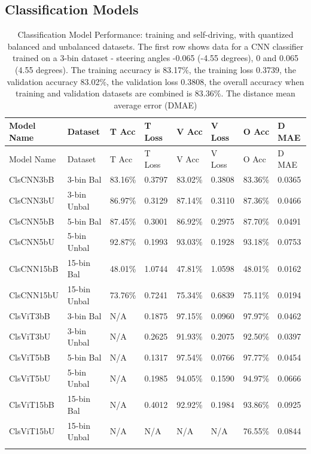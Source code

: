 \subsection{Classification Models}
\begin{longtable}{@{}llllllll@{}}
\toprule
Model Name & Dataset & T Acc & T Loss & V Acc & V Loss & O Acc & D MAE \\
\midrule
\endfirsthead
\toprule
Model Name & Dataset & T Acc & T Loss & V Acc & V Loss & O Acc & D MAE \\
\midrule
\endhead
ClsCNN3bB & 3-bin Bal & 83.16\% & 0.3797 & 83.02\% & 0.3808 & 83.36\% & 0.0365 \\
ClsCNN3bU & 3-bin Unbal & 86.97\% & 0.3129 & 87.14\% & 0.3110 & 87.36\% & 0.0466 \\
ClsCNN5bB & 5-bin Bal & 87.45\% & 0.3001 & 86.92\% & 0.2975 & 87.70\% & 0.0491 \\
ClsCNN5bU & 5-bin Unbal & 92.87\% & 0.1993 & 93.03\% & 0.1928 & 93.18\% & 0.0753 \\
ClsCNN15bB & 15-bin Bal & 48.01\% & 1.0744 & 47.81\% & 1.0598 & 48.01\% & 0.0162 \\
ClsCNN15bU & 15-bin Unbal & 73.76\% & 0.7241 & 75.34\% & 0.6839 & 75.11\% & 0.0194 \\
ClsViT3bB & 3-bin Bal & N/A & 0.1875 & 97.15\% & 0.0960 & 97.97\% & 0.0462 \\
ClsViT3bU & 3-bin Unbal & N/A & 0.2625 & 91.93\% & 0.2075 & 92.50\% & 0.0397 \\
ClsViT5bB & 5-bin Bal & N/A & 0.1317 & 97.54\% & 0.0766 & 97.77\% & 0.0454 \\
ClsViT5bU & 5-bin Unbal & N/A & 0.1985 & 94.05\% & 0.1590 & 94.97\% & 0.0666 \\
ClsViT15bB & 15-bin Bal & N/A & 0.4012 & 92.92\% & 0.1984 & 93.86\% & 0.0925 \\
ClsViT15bU & 15-bin Unbal & N/A & N/A & N/A & N/A & 76.55\% & 0.0844 \\
\bottomrule
\caption{Classification Model Performance: training and self-driving, with quantized balanced and unbalanced datasets. The first row shows data for a CNN classifier trained on a 3-bin dataset - steering angles -0.065 (-4.55 degrees), 0 and 0.065 (4.55 degrees). The training accuracy is 83.17\%, the training loss 0.3739, the validation accuracy 83.02\%, the validation loss 0.3808, the overall accuracy when training and validation datasets are combined is 83.36\%. The distance mean average error (DMAE)}
\label{results:classifier_models_results_table}
\end{longtable}

